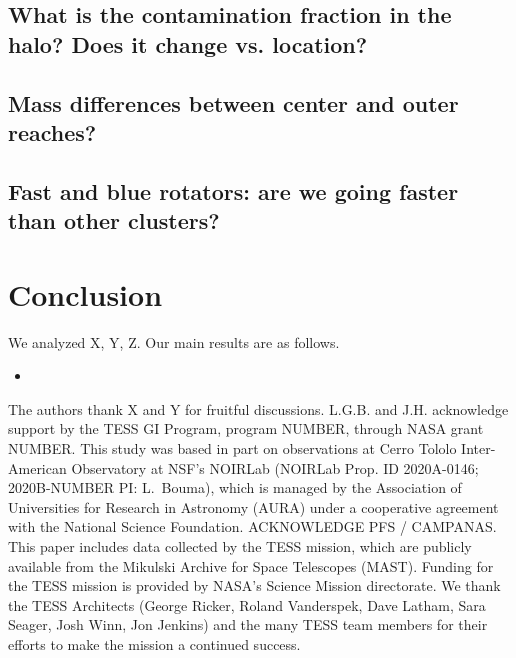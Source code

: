 \documentclass[12pt,twocolumn,tighten]{aastex63}
\begin{document}
\subsection{What is the contamination fraction in the halo? Does it change vs. location?}

\subsection{Mass differences between center and outer reaches?}

\subsection{Fast and blue rotators: are we going faster than other clusters?}

\section{Conclusion}
\label{sec:conclusion}

We analyzed X, Y, Z.
Our main results are as follows.
\begin{itemize}
	\item 
\end{itemize}




\acknowledgements
\raggedbottom

The authors thank X and Y for fruitful discussions.
%
L.G.B. and J.H. acknowledge support by the TESS GI Program, program
NUMBER, through NASA grant NUMBER.
%
This study was based in part on observations at Cerro Tololo
Inter-American Observatory at NSF's NOIRLab (NOIRLab Prop. ID
2020A-0146; 2020B-NUMBER PI: L{.}~Bouma), which is managed by the
Association of Universities for Research in Astronomy (AURA) under a
cooperative agreement with the National Science Foundation.
%
ACKNOWLEDGE PFS / CAMPANAS.
%
This paper includes data collected by the TESS mission, which are
publicly available from the Mikulski Archive for Space Telescopes
(MAST).
%
Funding for the TESS mission is provided by NASA's Science Mission
directorate.
%
We thank the TESS Architects (George Ricker, Roland Vanderspek, Dave
Latham, Sara Seager, Josh Winn, Jon Jenkins) and the many TESS team
members for their efforts to make the mission a continued success.
%

%
%
\end{document}
